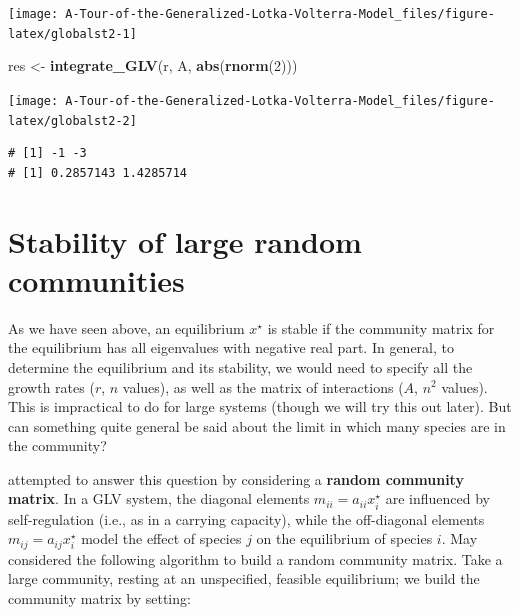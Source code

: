 \documentclass[
]{book}
\newenvironment{Shaded}{\begin{snugshade}}{\end{snugshade}}
\newcommand{\DecValTok}[1]{\textcolor[rgb]{0.00,0.00,0.81}{#1}}
\newcommand{\KeywordTok}[1]{\textcolor[rgb]{0.13,0.29,0.53}{\textbf{#1}}}
\newcommand{\NormalTok}[1]{#1}
\newcommand{\StringTok}[1]{\textcolor[rgb]{0.31,0.60,0.02}{#1}}
\begin{document}
\begin{center}\texttt{[image: A-Tour-of-the-Generalized-Lotka-Volterra-Model\_files/figure-latex/globalst2-1]} \end{center}

\begin{Shaded}
\begin{Highlighting}[]
\NormalTok{res <-}\StringTok{ }\KeywordTok{integrate_GLV}\NormalTok{(r, A, }\KeywordTok{abs}\NormalTok{(}\KeywordTok{rnorm}\NormalTok{(}\DecValTok{2}\NormalTok{)))}
\end{Highlighting}
\end{Shaded}

\begin{center}\texttt{[image: A-Tour-of-the-Generalized-Lotka-Volterra-Model\_files/figure-latex/globalst2-2]} \end{center}

\begin{verbatim}
# [1] -1 -3
# [1] 0.2857143 1.4285714
\end{verbatim}

\hypertarget{stability-of-large-random-communities}{%
\section{Stability of large random communities}\label{stability-of-large-random-communities}}

As we have seen above, an equilibrium \(x^\star\) is stable if the community matrix for the equilibrium has all eigenvalues with negative real part. In general, to determine the equilibrium and its stability, we would need to specify all the growth rates (\(r\), \(n\) values), as well as the matrix of interactions (\(A\), \(n^2\) values). This is impractical to do for large systems (though we will try this out later). But can something quite general be said about the limit in which many species are in the community?

\citet{may1972will} attempted to answer this question by considering a \textbf{random community matrix}. In a GLV system, the diagonal elements \(m_{ii} = a_{ii} x_i^\star\) are influenced by self-regulation (i.e., as in a carrying capacity), while the off-diagonal elements \(m_{ij} = a_{ij} x_i^\star\) model the effect of species \(j\) on the equilibrium of species \(i\). May considered the following algorithm to build a random community matrix. Take a large community, resting at an unspecified, feasible equilibrium; we build the community matrix by setting:
\end{document}
